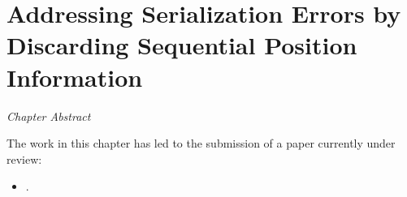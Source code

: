 
\chapter{Addressing Serialization Errors by Discarding Sequential Position Information}
\label{chapter:chapter4}

\renewcommand{\leftmark}{\spacedlowsmallcaps{Addressing Serialization Errors by Discarding Sequential Position Information}}

\begin{chapabstract}
    {\em
    Chapter Abstract


    \vspace*{5mm}
    The work in this chapter has led to the submission of a paper currently under review:}
    \begin{itemize}
        \item \small \fullcite{}.
    \end{itemize}
\end{chapabstract}



\newpage

\minitoc
{}

